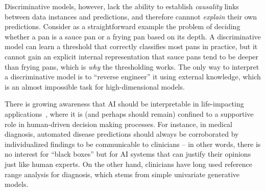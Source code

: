 \documentclass[english]{scrartcl}
\begin{document}
Discriminative models, however, lack the ability to establish {\em causality} links between data instances and predictions, and therefore cannnot {\em explain} their own predictions. Consider as a straightforward example the problem of deciding whether a pan is a sauce pan or a frying pan based on its depth. A discriminative model can learn a threshold that correctly classifies most pans in practice, but it cannot gain an explicit internal representation that sauce pans tend to be deeper than frying pans, which is {\em why} the thresholding works. The only way to interpret a discriminative model is to ``reverse engineer'' it using external knowledge, which is an almost impossible task for high-dimensional models.

There is growing awareness that AI should be interpretable in life-impacting applications~\cite{Molnar-18}, where it is (and perhaps should remain) confined to a supportive role in human-driven decision making processes. For instance, in medical diagnosis, automated disease predictions should always be corroborated by individualized findings to be communicable to clinicians -- in other words, there is no interest for ``black boxes'' but for AI systems that can justify their opinions just like human experts. On the other hand, clinicians have long used reference range analysis for diagnosis, which stems from simple univariate generative models.






\end{document}
